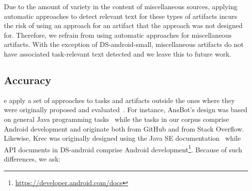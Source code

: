 
Due to the amount of variety in the content of miscellaneous sources, 
applying automatic approaches to detect relevant text for these types of artifacts
incurs the risk of using an approach for an artifact that the approach was not designed for.
Therefore, we refrain from using automatic approaches for miscellaneous artifacts.
With the exception of \acs{DS-android-small}, miscellaneous artifacts do not have associated task-relevant text detected and we leave this to future work.




 

% 
% 
% 







\subsection{Accuracy}
\label{cp4:relevant-text-accuracy}


\vspace{3mm}



\vspace{3mm}
e apply a set of approaches 
to tasks and artifacts outside the ones where they were originally proposed and evaluated~\cite{nadi2020, Robillard2015, Lotufo2012, Xu2017}.
For instance, \acs{AnsBot}'s design was based on general Java programming tasks~\cite{Xu2017} while the tasks in our corpus comprise Android development and originate both from GitHub and from Stack Overflow. 
Likewise, \acs{Krec} was originally designed using the Java SE documentation~\cite{Robillard2015} 
while API documents in \acs{DS-android} comprise Android development\footnote{\url{https://developer.android.com/docs}}.
Because of such differences, we ask:


